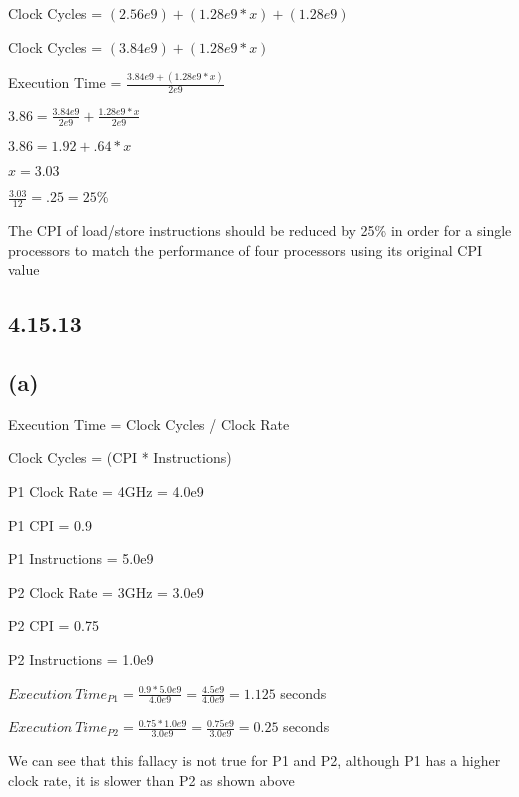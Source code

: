 \documentclass{article}
\begin{document}
    Clock Cycles = $(2.56e9) + (1.28e9 * x) + (1.28e9)$

    Clock Cycles = $(3.84e9) + (1.28e9 * x)$
    \vspace*{6pt}

    Execution Time = $\frac{3.84e9 + (1.28e9 * x)}{2e9}$
    \vspace*{6pt}

    $3.86 = \frac{3.84e9}{2e9} + \frac{1.28e9 * x}{2e9}$
    \vspace*{6pt}

    $3.86 = 1.92 + .64 * x$
    \vspace*{6pt}

    $x = 3.03$

    $\frac{3.03}{12} = .25 = 25\%$ 
    \vspace*{6pt}

    The CPI of load/store instructions should be reduced by 25\% in order for a single processors to match the performance of four processors using its original CPI value

    \subsection*{4.15.13}

    \subsection*{(a)}

    Execution Time = Clock Cycles / Clock Rate

    Clock Cycles = (CPI * Instructions)

    P1 Clock Rate = 4GHz = 4.0e9
    
    P1 CPI = 0.9

    P1 Instructions = 5.0e9
    \vspace*{6pt}

    P2 Clock Rate = 3GHz = 3.0e9
    
    P2 CPI = 0.75

    P2 Instructions = 1.0e9
    \vspace*{6pt}

    $Execution\ Time_{P1} = \frac{0.9 * 5.0e9}{4.0e9} = \frac{4.5e9}{4.0e9} = 1.125$ seconds

    $Execution\ Time_{P2} = \frac{0.75 * 1.0e9}{3.0e9} = \frac{0.75e9}{3.0e9} = 0.25$ seconds

    We can see that this fallacy is not true for P1 and P2, although P1 has a higher clock rate, it is slower than P2 as shown above
\end{document}
